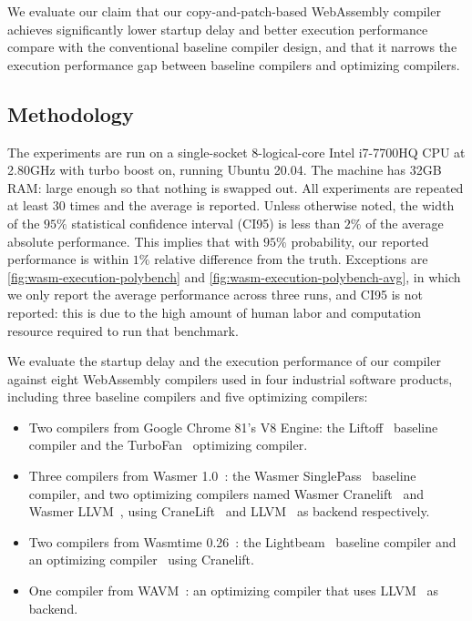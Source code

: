 \documentclass[acmsmall,nonacm,screen]{acmart}\settopmatter{printfolios=true,printccs=true,printacmref=false}
\newcommand{\figref}[1]{\autoref{#1}}
\newcommand{\cp}{copy-and-patch}
\begin{document}
We evaluate our claim that our \cp{}-based WebAssembly compiler achieves significantly lower startup delay and better execution performance compare with the conventional baseline compiler design, and that it narrows the execution performance gap between baseline compilers and optimizing compilers. 

\subsection{Methodology}
\label{sec:webassembly-methodology}

The experiments are run on a single-socket 8-logical-core Intel i7-7700HQ CPU at 2.80GHz with turbo boost on, running Ubuntu 20.04. The machine has 32GB RAM: large enough so that nothing is swapped out. All experiments are repeated at least \num{30} times and the average is reported. Unless otherwise noted, the width of the $95\%$ statistical confidence interval (CI95) is less than $2\%$ of the average absolute performance. This implies that with $95\%$ probability, our reported performance is within $1\%$ relative difference from the truth. Exceptions are \figref{fig:wasm-execution-polybench} and \figref{fig:wasm-execution-polybench-avg}, in which we only report the average performance across three runs, and CI95 is not reported: this is due to the high amount of human labor and computation resource required to run that benchmark.

We evaluate the startup delay and the execution performance of our compiler against eight WebAssembly compilers used in four industrial software products, including three baseline compilers and five optimizing compilers:
\begin{itemize}
    \item Two compilers from Google Chrome 81's V8 Engine: the Liftoff~\cite{liftoffBlog} baseline compiler and the TurboFan~\cite{liftoffBlog} optimizing compiler.
    \item Three compilers from Wasmer 1.0~\cite{wasmer}: the Wasmer SinglePass~\cite{wasmerSinglepassJit} baseline compiler, and two optimizing compilers named Wasmer Cranelift~\cite{wasmerCraneliftJit} and Wasmer LLVM~\cite{wasmerLLVMJit}, using CraneLift~\cite{cranelift} and LLVM~\cite{llvmIrPaper} as backend respectively.
    \item Two compilers from Wasmtime 0.26~\cite{wasmtime}: the Lightbeam~\cite{wasmtimeLightbeam} baseline compiler and an optimizing compiler~\cite{wasmtimeCranelift} using Cranelift.
    \item One compiler from WAVM~\cite{wavm}: an optimizing compiler that uses LLVM~\cite{llvmIrPaper} as backend.
\end{itemize} 
\end{document}

